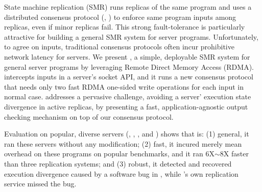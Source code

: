 

State machine replication (SMR) runs replicas of the same program and 
uses a distributed consensus protocol (\eg, \paxos) to enforce same program 
inputs among replicas, even if minor replicas fail. This strong 
fault-tolerance is particularly attractive for building a general SMR system 
for server programs. Unfortunately, to agree on inputs, traditional consensus 
protocols often incur prohibitive network latency for servers. We present \xxx, 
a simple, deployable SMR system for general server programs by leveraging 
Remote Direct Memory Access (RDMA). \xxx intercepts inputs in a server's socket 
API, and it runs a new \paxos consensus protocol that needs only two fast 
RDMA one-sided write operations for each input in normal case. \xxx 
addresses a pervasive challenge, avoiding a server' execution state divergence 
in active replicas, by presenting a fast, application-agnostic output checking 
mechanism on top of our consensus protocol.

Evaluation on \nprog popular, diverse servers (\eg, \memcached, \mysql, 
and \clamav) shows that \xxx is: (1) general, it ran these servers without any 
modification; (2) fast, it incured merely \overhead mean overhead 
on these programs on popular benchmarks, and it ran 6X$\sim$8X faster than 
three replication systems; and (3) robust, it detected and recovered execution 
divergence caused by a software bug in \redis, while \redis's own replication 
service missed the bug.


